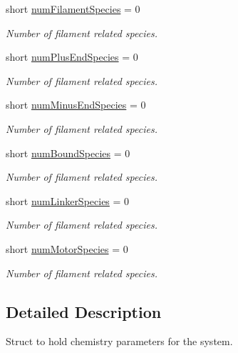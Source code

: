 {\bf }\par
\begin{DoxyCompactItemize}
\item 
short \hyperlink{structChemistryParameters_aa3ff68ed0be86482f1ea6d40b9d0fa1c}{num\+Filament\+Species} = 0
\begin{DoxyCompactList}\small\item\em Number of filament related species. \end{DoxyCompactList}\item 
short \hyperlink{structChemistryParameters_a14a3adb276b758bb6f2e5d0a27f80b15}{num\+Plus\+End\+Species} = 0
\begin{DoxyCompactList}\small\item\em Number of filament related species. \end{DoxyCompactList}\item 
short \hyperlink{structChemistryParameters_a13d911b0639656b466b1ea13be22be00}{num\+Minus\+End\+Species} = 0
\begin{DoxyCompactList}\small\item\em Number of filament related species. \end{DoxyCompactList}\item 
short \hyperlink{structChemistryParameters_a47fbf96b070976e8e0b7bb25a381ea54}{num\+Bound\+Species} = 0
\begin{DoxyCompactList}\small\item\em Number of filament related species. \end{DoxyCompactList}\item 
short \hyperlink{structChemistryParameters_af82c8c5d13f1e092d9eb69a7e8e3b5a4}{num\+Linker\+Species} = 0
\begin{DoxyCompactList}\small\item\em Number of filament related species. \end{DoxyCompactList}\item 
short \hyperlink{structChemistryParameters_a6aecadee2f3bb6bc436395473447c485}{num\+Motor\+Species} = 0
\begin{DoxyCompactList}\small\item\em Number of filament related species. \end{DoxyCompactList}\end{DoxyCompactItemize}



\subsection{Detailed Description}
Struct to hold chemistry parameters for the system. 

